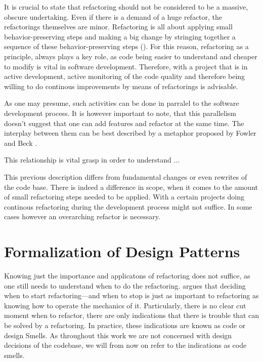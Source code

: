 It is crucial to state that refactoring should not be considered to be a massive, obscure undertaking.
Even if there is a demand of a huge refactor, the refactorings themselves are minor.
Refactoring is all about applying small behavior-preserving steps and making a big change by stringing together a sequence of these behavior-preserving steps (\cite[p.~45]{fowler2018}). 
For this reason, refactoring as a principle, 
	always plays a key role, 
	as code being easier to understand and cheaper to modify is vital in software development.
Therefore, with a project that is in active development, 
	active monitoring of the code quality and therefore being willing to do continous improvements 
	by means of refactorings is advisable.

As one may presume, such activities can be done in parralel to the software development process.
It is however important to note, 
	that this parallelism doesn't suggest that one can add features and refactor at the same time.
The interplay between them can be best described by a metaphor proposed by Fowler and Beck \textcite[p.~47]{fowler2018}. 





This relationship is vital grasp in order to understand ...

This previous description differs from fundamental changes or even rewrites of the code base.
There is indeed a difference in scope, 
	when it comes to the amount of small refactoring steps needed to be applied. 
With a certain projects doing continous refactoring during the development process might not suffice. 
In some cases however an overarching refactor is necessary.







\section{Formalization of Design Patterns}

Knowing just the importance and applicatons of refactoring does not suffice, 
	as one still needs to understand when to do the refactoring.
\textcite{fowler2018} argues that deciding when to start refactoring—and when to stop 
	is just as important to refactoring as knowing how to operate the mechanics of it.
Particularly, there is no clear cut moment when to refactor, 
	there are only indications that there is trouble that can be solved by a refactoring.
In practice, these indications are known as code or design Smells.
As throughout this work we are not concerned with design decisions of the codebase, 
	we will from now on refer to the indications as code smells.

